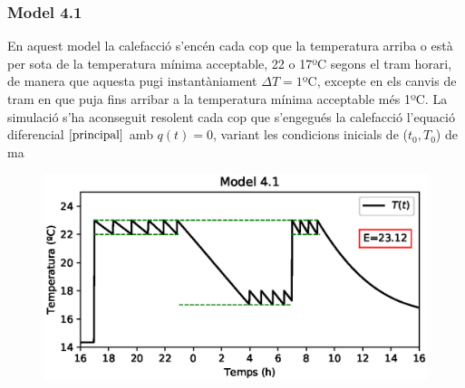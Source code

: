 \documentclass[11pt]{article}
\begin{document}
\subsubsection*{Model 4.1}
En aquest model la calefacció s'encén cada cop que la temperatura arriba o està per sota de la temperatura mínima acceptable, 22 o 17ºC segons el tram horari, de manera que aquesta pugi instantàniament $\Delta T=1$ºC, excepte en els canvis de tram en que puja fins arribar a la temperatura mínima acceptable més 1ºC. La simulació s'ha aconseguit resolent cada cop que s'engegués la calefacció l'equació diferencial $\eqref{principal}$ amb $q(t)=0$, variant les condicions inicials de ($t_0,T_0$) de ma
\begin{figure}[h!]
	\centering
	\includegraphics[width=13cm]{model411.eps}
\end{figure}
\end{document}
